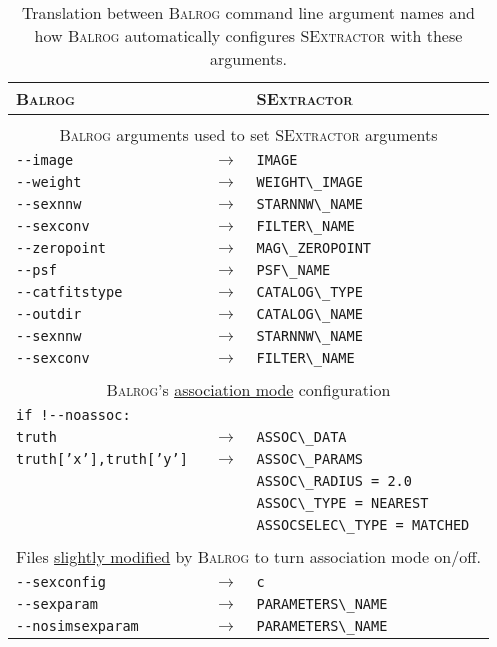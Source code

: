 \documentclass[11pt]{book}
\newcommand{\codett}[1]{\lstinline{#1}}
\newcommand{\balrog}{\textsc{Balrog}}
\newcommand{\sex}{\textsc{SExtractor}}
\newcommand{\opt}[1]{\codett{--#1}}
\begin{document}
\begin{table}[h]
\caption{Translation between \balrog{} command line argument names and how \balrog{} automatically configures
\sex{} with these arguments.} \label{tab:b2s}
\begin{tabular}{l l l} \toprule %

\rowcolor{gray2} \textbf{\balrog{}} & & \textbf{\sex{}} \\ \midrule 
\rowcolor{white} & & \\
\multicolumn{3}{c}{\balrog{} arguments used to set \sex{} arguments} \\
\opt{image} & $\rightarrow$ & \codett{IMAGE} \\
\opt{weight} &  $\rightarrow$ & \codett{WEIGHT\_IMAGE}\\
\opt{sexnnw} & $\rightarrow$ & \codett{STARNNW\_NAME} \\
\opt{sexconv} & $\rightarrow$ & \codett{FILTER\_NAME} \\
\opt{zeropoint} & $\rightarrow$ & \codett{MAG\_ZEROPOINT} \\
\opt{psf} & $\rightarrow$ & \codett{PSF\_NAME} \\
\opt{catfitstype} & $\rightarrow$ & \codett{CATALOG\_TYPE} \\
\opt{outdir} & $\rightarrow$ & \codett{CATALOG\_NAME} \\ 
\opt{sexnnw} & $\rightarrow$ & \codett{STARNNW\_NAME} \\ 
\opt{sexconv} & $\rightarrow$ & \codett{FILTER\_NAME} \\ 

\rowcolor{white} & & \\
\multicolumn{3}{c}{\balrog{}'s \hyperlink{hpyer:assoc}{association mode} configuration} \\
\rowcolor{gray1} \codett{if !--noassoc:} & & \\
\rowcolor{gray1} \texttt{truth} & $\rightarrow$ & \codett{ASSOC\_DATA} \\
\rowcolor{gray1} \texttt{truth['x'],truth['y']} & $\rightarrow$ & \codett{ASSOC\_PARAMS} \\
\rowcolor{gray1} & & \codett{ASSOC\_RADIUS = 2.0} \\
\rowcolor{gray1} & & \codett{ASSOC\_TYPE = NEAREST} \\
\rowcolor{gray1} & & \codett{ASSOCSELEC\_TYPE = MATCHED} \\
\rowcolor{white} & & \\
\multicolumn{3}{c}{Files \hyperlink{hyper:sexfiles}{slightly modified} by \balrog{} to turn association mode on/off.} \\
\opt{sexconfig} & $\rightarrow$  &\codett{c} \\
\opt{sexparam} & $\rightarrow$  &\codett{PARAMETERS\_NAME} \\ 
\opt{nosimsexparam} & $\rightarrow$  &\codett{PARAMETERS\_NAME} \\ \bottomrule


\end{tabular}
\end{table}
\end{document}
